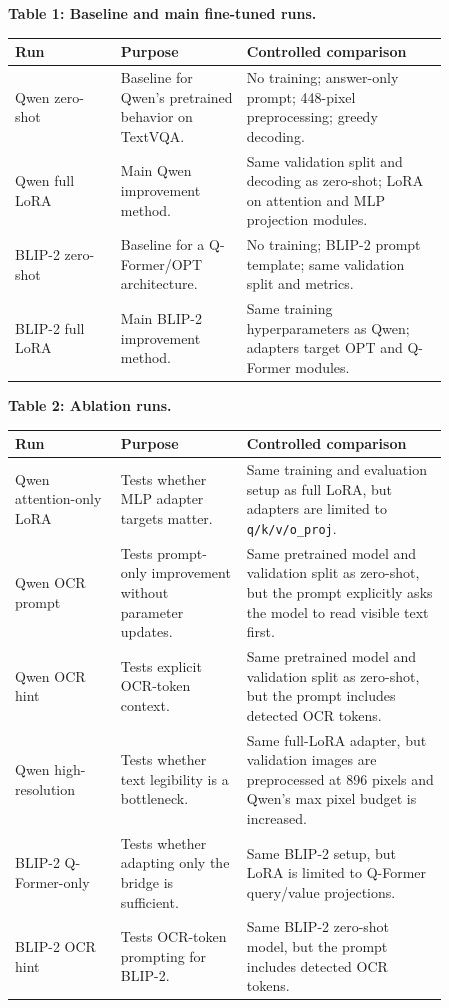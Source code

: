 \documentclass[11pt]{article}
\begin{document}
\begin{center}
\small
\textbf{Table 1: Baseline and main fine-tuned runs.}\\[0.5em]
\begin{tabular}{>{\raggedright\arraybackslash}p{0.21\linewidth}>{\raggedright\arraybackslash}p{0.25\linewidth}>{\raggedright\arraybackslash}p{0.40\linewidth}}
\toprule
Run & Purpose & Controlled comparison \\
\midrule
Qwen zero-shot & Baseline for Qwen's pretrained behavior on TextVQA. & No training; answer-only prompt; 448-pixel preprocessing; greedy decoding. \\
Qwen full LoRA & Main Qwen improvement method. & Same validation split and decoding as zero-shot; LoRA on attention and MLP projection modules. \\
BLIP-2 zero-shot & Baseline for a Q-Former/OPT architecture. & No training; BLIP-2 prompt template; same validation split and metrics. \\
BLIP-2 full LoRA & Main BLIP-2 improvement method. & Same training hyperparameters as Qwen; adapters target OPT and Q-Former modules. \\
\bottomrule
\end{tabular}
\end{center}

\vspace{0.75em}

\begin{center}
\small
\textbf{Table 2: Ablation runs.}\\[0.5em]
\begin{tabular}{>{\raggedright\arraybackslash}p{0.21\linewidth}>{\raggedright\arraybackslash}p{0.25\linewidth}>{\raggedright\arraybackslash}p{0.40\linewidth}}
\toprule
Run & Purpose & Controlled comparison \\
\midrule
Qwen attention-only LoRA & Tests whether MLP adapter targets matter. & Same training and evaluation setup as full LoRA, but adapters are limited to \texttt{q/k/v/o\_proj}. \\
Qwen OCR prompt & Tests prompt-only improvement without parameter updates. & Same pretrained model and validation split as zero-shot, but the prompt explicitly asks the model to read visible text first. \\
Qwen OCR hint & Tests explicit OCR-token context. & Same pretrained model and validation split as zero-shot, but the prompt includes detected OCR tokens. \\
Qwen high-resolution & Tests whether text legibility is a bottleneck. & Same full-LoRA adapter, but validation images are preprocessed at 896 pixels and Qwen's max pixel budget is increased. \\
BLIP-2 Q-Former-only & Tests whether adapting only the bridge is sufficient. & Same BLIP-2 setup, but LoRA is limited to Q-Former query/value projections. \\
BLIP-2 OCR hint & Tests OCR-token prompting for BLIP-2. & Same BLIP-2 zero-shot model, but the prompt includes detected OCR tokens. \\
\bottomrule
\end{tabular}
\end{center}
\end{document}
